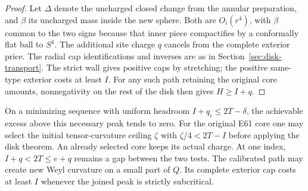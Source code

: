 \documentclass[11pt,letterpaper]{article}
\numberwithin{equation}{section}
\begin{document}
\begin{proof}
Let \(\Delta\) denote the uncharged closed change from the annular
preparation, and \(\beta\) its uncharged mass inside the new sphere.
Both are \(O_i(r^4)\), with \(\beta\) common to the two signs because
that inner piece compactifies by a conformally flat ball to \(S^4\).
The additional site charge \(q\) cancels from the complete exterior
price. The radial cap identifications and inverses are as in
Section~\ref{sec:disk-transport}. The strict wall gives positive
caps by stretching; the positive same-type exterior costs at least
\(I\). For any such path retaining the original core amounts,
nonnegativity on the rest of the disk then gives \(H\ge I+q\).
\end{proof}

On a minimizing sequence with uniform headroom \(I+q_i\le2T-\delta\),
the achievable excess above this necessary peak tends to zero.
For the original E61 core one may select the initial tensor-curvature
ceiling \(\zeta\) with \(\zeta/4<2T-I\) before applying the disk
theorem. An already selected core keeps its actual charge. At one
index, \(I+q<2T\le e+q\) remains a gap between the two tests.
The calibrated path may create new Weyl curvature on a small part
of \(Q\). Its complete exterior cap costs at least \(I\) whenever the joined peak is strictly subcritical.
\end{document}
